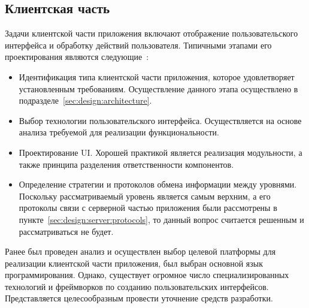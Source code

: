 \subsection{Клиентская часть}
\label{sec:design:client}

Задачи клиентской части приложения включают отображение пользовательского интерфейса и обработку действий пользователя. Типичными этапами его проектирования являются следующие~\cite[с.~78]{applicationArchitectureGuide}:

\begin{itemize}
	\item Идентификация типа клиентской части приложения, которое удовлетворяет установленным требованиям. Осуществление данного этапа осуществлено в подразделе~\ref{sec:design:architecture}.
	\item Выбор технологии пользовательского интерфейса. Осуществляется на основе анализа требуемой для реализации функциональности.
	\item Проектирование UI. Хорошей практикой является реализация модульности, а также принципа разделения ответственности компонентов.
	\item Определение стратегии и протоколов обмена информации между уровнями. Поскольку рассматриваемый уровень является самым верхним, а его протоколы связи с серверной частью приложения были рассмотрены в пункте~\ref{sec:design:server:protocols}, то данный вопрос считается решенным и рассматриваться не будет.
\end{itemize}

Ранее был проведен анализ и осуществлен выбор целевой платформы для реализации клиентской части приложения, был выбран основной язык программирования. Однако, существует огромное число специализированных технологий и фреймворков по созданию пользовательских интерфейсов. Представляется целесообразным провести уточнение средств разработки.

\subsubsection{}
\label{sec:design:client:technologies}

